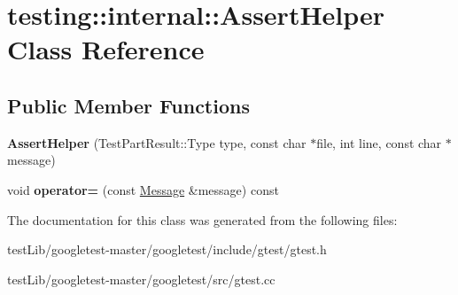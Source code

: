 \hypertarget{classtesting_1_1internal_1_1AssertHelper}{}\section{testing\+:\+:internal\+:\+:Assert\+Helper Class Reference}
\label{classtesting_1_1internal_1_1AssertHelper}
\subsection*{Public Member Functions}
\begin{DoxyCompactItemize}
\item 
\mbox{\label{classtesting_1_1internal_1_1AssertHelper_ac2c9334518fd4087189b4505567a3c90}} 
{\bfseries Assert\+Helper} (Test\+Part\+Result\+::\+Type type, const char $\ast$file, int line, const char $\ast$message)
\item 
\mbox{\label{classtesting_1_1internal_1_1AssertHelper_a97bf22d786131ab7baa86b97a27aeb4d}} 
void {\bfseries operator=} (const \hyperlink{classtesting_1_1Message}{Message} \&message) const
\end{DoxyCompactItemize}


The documentation for this class was generated from the following files\+:\begin{DoxyCompactItemize}
\item 
test\+Lib/googletest-\/master/googletest/include/gtest/gtest.\+h\item 
test\+Lib/googletest-\/master/googletest/src/gtest.\+cc\end{DoxyCompactItemize}
